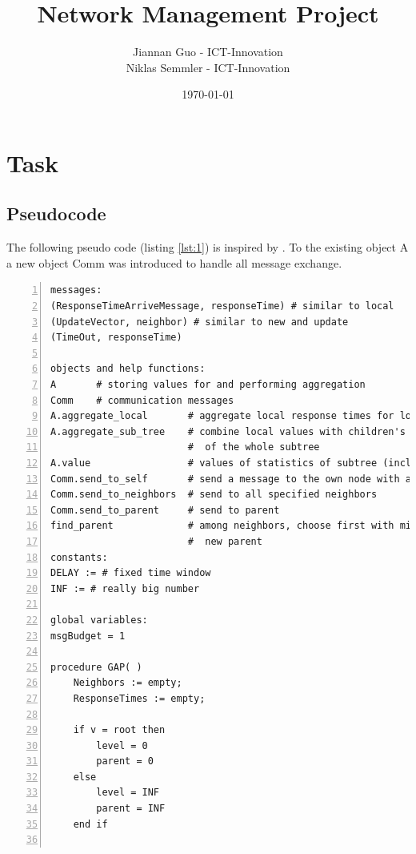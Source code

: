 \documentclass[a4paper, smallheadings,english]{scrartcl}
\newcommand{\Author}{Jiannan Guo - ICT-Innovation\\Niklas Semmler - ICT-Innovation}
\newcommand{\Title}{Network Management Project}
\begin{document}
\title{\Title}
\author{\Author}
\date{\today}
\maketitle
\thispagestyle{firststyle}
\section{Task}
\label{sec:task1}
\subsection{Pseudocode}
The following pseudo code (listing \ref{lst:1}) is inspired by \cite{stadler2012protocols}. To the existing object A a new object Comm was introduced to handle all message exchange.
\begin{lstlisting}[caption={Pseudocode for $\widetilde{f}(t)$ with rate control}, label={lst:1}, numbers=left, frame=single]
messages:
(ResponseTimeArriveMessage, responseTime) # similar to local
(UpdateVector, neighbor) # similar to new and update
(TimeOut, responseTime)

objects and help functions:
A       # storing values for and performing aggregation
Comm    # communication messages
A.aggregate_local       # aggregate local response times for local statistics
A.aggregate_sub_tree    # combine local values with children's for statistics
                        #  of the whole subtree
A.value                 # values of statistics of subtree (including own)
Comm.send_to_self       # send a message to the own node with a delay
Comm.send_to_neighbors  # send to all specified neighbors
Comm.send_to_parent     # send to parent
find_parent             # among neighbors, choose first with minimum level as
                        #  new parent
constants:
DELAY := # fixed time window
INF := # really big number

global variables:
msgBudget = 1

procedure GAP( )
    Neighbors := empty;
    ResponseTimes := empty;

    if v = root then
        level = 0
        parent = 0
    else
        level = INF
        parent = INF
    end if


\end{lstlisting}
\end{document}
